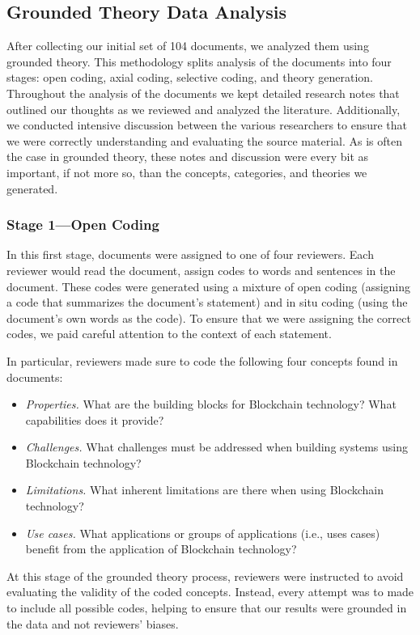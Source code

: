 \subsection{Grounded Theory Data Analysis}
After collecting our initial set of 104 documents, we analyzed them using grounded theory.
This methodology splits analysis of the documents into four stages: open coding, axial coding, selective coding, and theory generation.
Throughout the analysis of the documents we kept detailed research notes that outlined our thoughts as we reviewed and analyzed the literature.
Additionally, we conducted intensive discussion between the various researchers to ensure that we were correctly understanding and evaluating the source material.
As is often the case in grounded theory, these notes and discussion were every bit as important, if not more so, than the concepts, categories, and theories we generated.

\subsubsection{Stage 1---Open Coding}
In this first stage, documents were assigned to one of four reviewers.
Each reviewer would read the document, assign codes to words and sentences in the document.
These codes were generated using a mixture of open coding (assigning a code that summarizes the document's statement) and in situ coding (using the document's own words as the code).
To ensure that we were assigning the correct codes, we paid careful attention to the context of each statement.

In particular, reviewers made sure to code the following four concepts found in documents:
\begin{itemize}
	\item \emph{Properties.} What are the building blocks for Blockchain technology? What capabilities does it provide?
	\item \emph{Challenges.} What challenges must be addressed when building systems using Blockchain technology?
	\item \emph{Limitations.} What inherent limitations are there when using Blockchain technology?
	\item \emph{Use cases.} What applications or groups of applications (i.e., uses cases) benefit from the application of Blockchain technology?
\end{itemize}

At this stage of the grounded theory process, reviewers were instructed to avoid evaluating the validity of the coded concepts.
Instead, every attempt was to made to include all possible codes, helping to ensure that our results were grounded in the data and not reviewers' biases.

